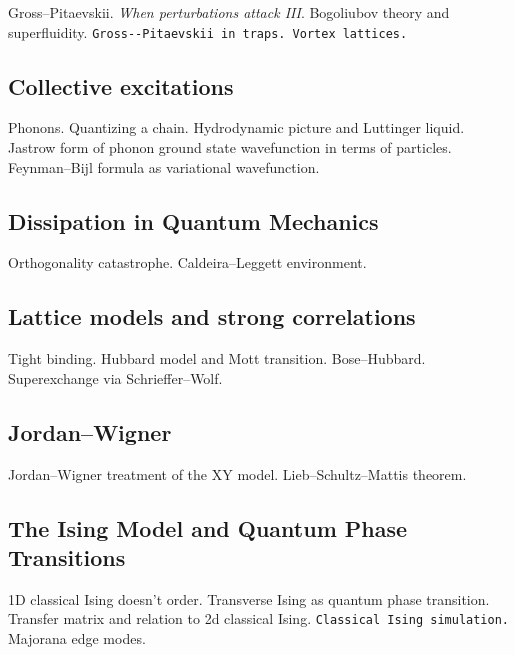 Gross--Pitaevskii. \emph{When perturbations attack III}. Bogoliubov theory and superfluidity. \verb|Gross--Pitaevskii in traps. Vortex lattices.|

\subsection{Collective excitations}

Phonons. Quantizing a chain. Hydrodynamic picture and Luttinger liquid. Jastrow form of phonon ground state wavefunction in terms of particles. Feynman–Bijl formula as variational wavefunction. 

\subsection{Dissipation in Quantum Mechanics}

Orthogonality catastrophe. Caldeira--Leggett environment.

\subsection{Lattice models and strong correlations}

Tight binding. Hubbard model and Mott transition. Bose--Hubbard. Superexchange via Schrieffer--Wolf.

\subsection{Jordan--Wigner}

Jordan--Wigner treatment of the XY model. Lieb--Schultz--Mattis theorem.


\subsection{The Ising Model and Quantum Phase Transitions}

1D classical Ising doesn't order. Transverse Ising as quantum phase transition. Transfer matrix and relation to 2d classical Ising. \verb|Classical Ising simulation.| Majorana edge modes.









